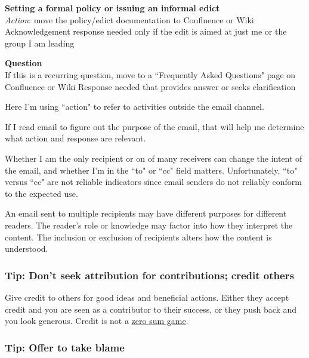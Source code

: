 \textbf{Setting a formal policy or issuing an informal edict}\\
\textit{Action}: move the policy/edict documentation to Confluence or Wiki
Acknowledgement response needed only if the edit is aimed at just me or the group I am leading

\textbf{Question}\\
If this is a recurring question, move to a ``Frequently Asked Questions" page on Confluence or Wiki
Response needed that provides answer or seeks clarification


Here I'm using ``action" to refer to activities outside the email channel. 

If I read email to figure out the purpose of the email, that will help me determine what action and response are relevant. 

Whether I am the only recipient or on of many receivers can change the intent of the email, and whether I'm in the ``to" or ``cc" field matters. Unfortunately, ``to" versus ``cc" are not reliable indicators since email senders do not reliably conform to the expected use. 




An email sent to multiple recipients may have different purposes for different readers. The reader's role or knowledge may factor into how they interpret the content. The inclusion or exclusion of recipients alters how the content is understood. 

\subsubsection{Tip: Don't seek attribution for contributions; credit others\label{sec:credit-others}}

Give credit to others for good ideas and beneficial actions. Either they accept credit and you are seen as a contributor to their success, or they push back and you look generous. Credit is not a \href{https://en.wikipedia.org/wiki/Zero-sum_game}{zero sum game}.

\subsubsection{Tip: Offer to take blame\label{sec:take-blame}}

